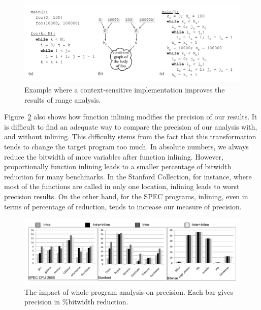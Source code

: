 \documentclass[times]{speauth}
\begin{document}
\begin{figure}[t!]
\begin{center}
\includegraphics[width=\textwidth]{images/context}
\end{center}
\caption{\label{fig:context}
Example where a context-sensitive implementation improves the results of
range analysis.
}
\end{figure}

Figure~\ref{fig:wholeImpact} also shows how function inlining modifies the
precision of our results.
It is difficult to find an adequate way to compare the precision of
our analysis with, and without inlining.
This difficulty stems from the fact that this transformation tends to change
the target program too much.
In absolute numbers, we always reduce the bitwidth of more variables after
function inlining.
However, proportionally function inlining leads to a smaller percentage of
bitwidth reduction for many benchmarks.
In the Stanford Collection, for instance, where most of the functions are
called in only one location, inlining leads to worst precision results.
On the other hand, for the SPEC programs, inlining, even in terms of
percentage of reduction, tends to increase our measure of precision.

\begin{figure}[t!]
\begin{center}
\includegraphics[width=\textwidth]{images/wholeImpact}
\end{center}
\caption{\label{fig:wholeImpact}
The impact of whole program analysis on precision. Each bar gives precision in
\%bitwidth reduction.}
\end{figure}
\end{document}
